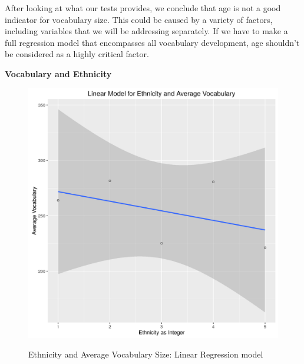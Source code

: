 \documentclass[11pt]{article}  %
\begin{document}
\indent After looking at what our tests provides, we conclude that age is not a good indicator for vocabulary size. This could be caused by a variety of factors, including variables that we will be addressing separately. If we have to make a full regression model that encompasses all vocabulary development, age shouldn't be considered as a highly critical factor.

\textbf{Vocabulary and Ethnicity}

\begin{figure}[h]
\centering
\caption{Ethnicity and Average Vocabulary Size: Linear Regression model}
\includegraphics[scale=.50]{means_ethn}
\label{SiEth}
\end{figure}
\end{document}
